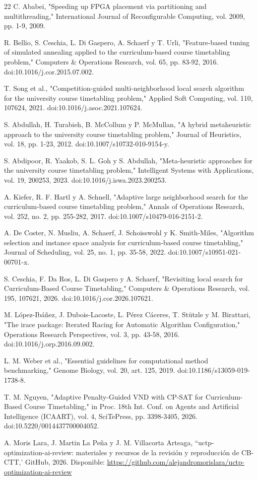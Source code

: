 \documentclass[journal]{IEEEtran}
\begin{document}
\begin{thebibliography}{22}
 C. Ababei, "Speeding up FPGA placement via partitioning and multithreading," International Journal of Reconfigurable Computing, vol. 2009, pp. 1-9, 2009.

 R. Bellio, S. Ceschia, L. Di Gaspero, A. Schaerf y T. Urli, "Feature-based tuning of simulated annealing applied to the curriculum-based course timetabling problem," Computers \& Operations Research, vol. 65, pp. 83-92, 2016. doi:10.1016/j.cor.2015.07.002.

 T. Song et al., "Competition-guided multi-neighborhood local search algorithm for the university course timetabling problem," Applied Soft Computing, vol. 110, 107624, 2021. doi:10.1016/j.asoc.2021.107624.

 S. Abdullah, H. Turabieh, B. McCollum y P. McMullan, "A hybrid metaheuristic approach to the university course timetabling problem," Journal of Heuristics, vol. 18, pp. 1-23, 2012. doi:10.1007/s10732-010-9154-y.

 S. Abdipoor, R. Yaakob, S. L. Goh y S. Abdullah, "Meta-heuristic approaches for the university course timetabling problem," Intelligent Systems with Applications, vol. 19, 200253, 2023. doi:10.1016/j.iswa.2023.200253.

 A. Kiefer, R. F. Hartl y A. Schnell, "Adaptive large neighborhood search for the curriculum-based course timetabling problem," Annals of Operations Research, vol. 252, no. 2, pp. 255-282, 2017. doi:10.1007/s10479-016-2151-2.

 A. De Coster, N. Musliu, A. Schaerf, J. Schoisswohl y K. Smith-Miles, "Algorithm selection and instance space analysis for curriculum-based course timetabling," Journal of Scheduling, vol. 25, no. 1, pp. 35-58, 2022. doi:10.1007/s10951-021-00701-x.

 S. Ceschia, F. Da Ros, L. Di Gaspero y A. Schaerf, "Revisiting local search for Curriculum-Based Course Timetabling," Computers \& Operations Research, vol. 195, 107621, 2026. doi:10.1016/j.cor.2026.107621.

 M. López-Ibáñez, J. Dubois-Lacoste, L. Pérez Cáceres, T. Stützle y M. Birattari, "The irace package: Iterated Racing for Automatic Algorithm Configuration," Operations Research Perspectives, vol. 3, pp. 43-58, 2016. doi:10.1016/j.orp.2016.09.002.

 L. M. Weber et al., "Essential guidelines for computational method benchmarking," Genome Biology, vol. 20, art. 125, 2019. doi:10.1186/s13059-019-1738-8.

 T. M. Nguyen, "Adaptive Penalty-Guided VND with CP-SAT for Curriculum-Based Course Timetabling," in Proc. 18th Int. Conf. on Agents and Artificial Intelligence (ICAART), vol. 4, SciTePress, pp. 3398-3405, 2026. doi:10.5220/0014437700004052.

 A. Moris Lara, J. Martin La Peña y J. M. Villacorta Arteaga, ``uctp-optimization-ai-review: materiales y recursos de la revisión y reproducción de CB-CTT,' GitHub, 2026. Disponible: \url{https://github.com/alejandromorislara/uctp-optimization-ai-review}

\end{thebibliography}
\end{document}

